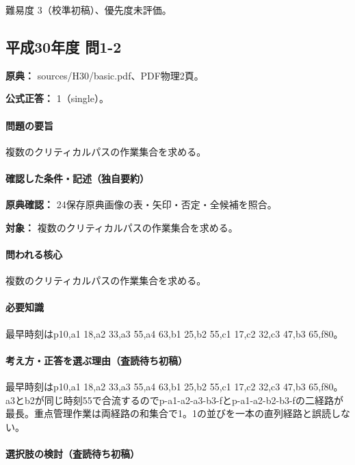 \par 難易度 3（校準初稿）、優先度未評価。

\subsection{平成30年度 問1-2}
\label{q:h30-reg-basic-1-2}

\noindent\textbf{原典：} sources/H30/basic.pdf、PDF物理2頁。

\textbf{公式正答：} 1（single）。

\paragraph{問題の要旨} 複数のクリティカルパスの作業集合を求める。

\paragraph{確認した条件・記述（独自要約）}\mbox{}\par

\noindent\textbf{原典確認：} 24保存原典画像の表・矢印・否定・全候補を照合。\par

\noindent\textbf{対象：} 複数のクリティカルパスの作業集合を求める。\par

\paragraph{問われる核心} 複数のクリティカルパスの作業集合を求める。

\paragraph{必要知識} 最早時刻はp10,a1 18,a2 33,a3 55,a4 63,b1 25,b2 55,c1 17,c2 32,c3 47,b3 65,f80。

\paragraph{考え方・正答を選ぶ理由（査読待ち初稿）} 最早時刻はp10,a1 18,a2 33,a3 55,a4 63,b1 25,b2 55,c1 17,c2 32,c3 47,b3 65,f80。a3とb2が同じ時刻55で合流するのでp-a1-a2-a3-b3-fとp-a1-a2-b2-b3-fの二経路が最長。重点管理作業は両経路の和集合で1。1の並びを一本の直列経路と誤読しない。

\paragraph{選択肢の検討（査読待ち初稿）}\mbox{}\par

